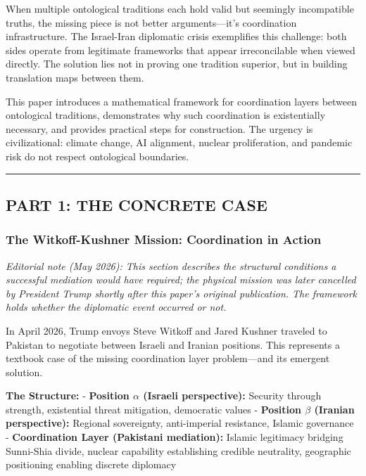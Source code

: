 \documentclass[
]{article}
\begin{document}
When multiple ontological traditions each hold valid but seemingly
incompatible truths, the missing piece is not better arguments---it's
coordination infrastructure. The Israel-Iran diplomatic crisis
exemplifies this challenge: both sides operate from legitimate
frameworks that appear irreconcilable when viewed directly. The solution
lies not in proving one tradition superior, but in building translation
maps between them.

This paper introduces a mathematical framework for coordination layers
between ontological traditions, demonstrates why such coordination is
existentially necessary, and provides practical steps for construction.
The urgency is civilizational: climate change, AI alignment, nuclear
proliferation, and pandemic risk do not respect ontological boundaries.

\begin{center}\rule{0.5\linewidth}{0.5pt}\end{center}

\subsection{PART 1: THE CONCRETE CASE}\label{part-1-the-concrete-case-1}

\subsubsection{The Witkoff-Kushner Mission: Coordination in
Action}\label{the-witkoff-kushner-mission-coordination-in-action}

\emph{Editorial note (May 2026): This section describes the
structural conditions a successful mediation would have required;
the physical mission was later cancelled by President Trump shortly
after this paper's original publication. The framework holds whether
the diplomatic event occurred or not.}

In April 2026, Trump envoys Steve Witkoff and Jared Kushner traveled to
Pakistan to negotiate between Israeli and Iranian positions. This
represents a textbook case of the missing coordination layer
problem---and its emergent solution.

\textbf{The Structure:} - \textbf{Position \(\alpha\) (Israeli perspective):}
Security through strength, existential threat mitigation, democratic
values - \textbf{Position \(\beta\) (Iranian perspective):} Regional
sovereignty, anti-imperial resistance, Islamic governance\\
- \textbf{Coordination Layer (Pakistani mediation):} Islamic legitimacy
bridging Sunni-Shia divide, nuclear capability establishing credible
neutrality, geographic positioning enabling discrete diplomacy
\end{document}
